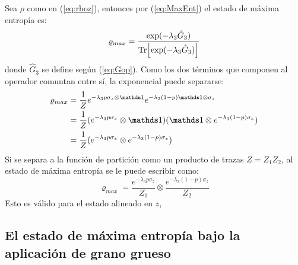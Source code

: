 Sea $\rho$ como en (\ref{eq:rhoz}), entonces por (\ref{eq:MaxEnt}) el estado de máxima entropía es:
\begin{equation}\label{eq:MaxEntUgly}
\varrho_{max}=\frac{\text{exp}(-\lambda_{3}\hat{G}_{3})}{\Tr[\text{exp}(-\lambda_{3}\hat{G}_{3})]}
\end{equation}
donde $\hat{G}_{3}$ se define según (\ref{eq:Gop}). Como los dos términos que componen al operador comuntan entre sí, la exponencial puede separarse:
\begin{align*}
\varrho_{max}&=\frac{1}{Z}e^{-\lambda_{3}p\sigma_{z}\otimes\Id}e^{-\lambda_{3}(1-p)\Id\otimes\sigma_{z}}\\
&=\frac{1}{Z}(e^{-\lambda_{3}p\sigma_{z}}\otimes\Id)( \Id\otimes e^{-\lambda_{3}(1-p)\sigma_{z}})\\
&=\frac{1}{Z}(e^{-\lambda_{3}p\sigma_{z}}\otimes e^{-\lambda_{3}(1-p)\sigma_{z}})\\
\end{align*}
Si se separa a la función de partición como un producto de trazas $Z=Z_{1}Z_{2}$, al estado de máxima entropía se le puede escribir como:
\begin{equation}\label{eq:MaxEntZ}
\varrho_{max}=\frac{e^{-\lambda_{3}p\sigma_{z}}}{Z_{1}} \otimes \frac{e^{-\lambda_{3}(1-p)\sigma_{z}}}{Z_{2}}
\end{equation}
Esto es válido para el estado alineado en $z$, 
\subsection{El estado de máxima entropía bajo la aplicación de grano grueso}

